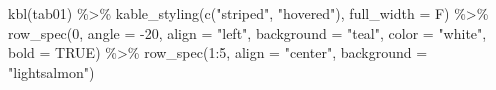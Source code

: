 \documentclass[
]{book}
\newenvironment{Shaded}{\begin{snugshade}}{\end{snugshade}}
\newcommand{\AttributeTok}[1]{\textcolor[rgb]{0.77,0.63,0.00}{#1}}
\newcommand{\ConstantTok}[1]{\textcolor[rgb]{0.00,0.00,0.00}{#1}}
\newcommand{\DecValTok}[1]{\textcolor[rgb]{0.00,0.00,0.81}{#1}}
\newcommand{\FunctionTok}[1]{\textcolor[rgb]{0.00,0.00,0.00}{#1}}
\newcommand{\NormalTok}[1]{#1}
\newcommand{\SpecialCharTok}[1]{\textcolor[rgb]{0.00,0.00,0.00}{#1}}
\newcommand{\StringTok}[1]{\textcolor[rgb]{0.31,0.60,0.02}{#1}}
\begin{document}
\begin{Shaded}
\begin{Highlighting}[]
\FunctionTok{kbl}\NormalTok{(tab01) }\SpecialCharTok{\%\textgreater{}\%} \FunctionTok{kable\_styling}\NormalTok{(}\FunctionTok{c}\NormalTok{(}\StringTok{"striped"}\NormalTok{, }\StringTok{"hovered"}\NormalTok{), }\AttributeTok{full\_width =}\NormalTok{ F) }\SpecialCharTok{\%\textgreater{}\%} 
  \FunctionTok{row\_spec}\NormalTok{(}\DecValTok{0}\NormalTok{, }\AttributeTok{angle =} \SpecialCharTok{{-}}\DecValTok{20}\NormalTok{, }\AttributeTok{align =} \StringTok{"left"}\NormalTok{, }\AttributeTok{background =} \StringTok{"teal"}\NormalTok{, }
    \AttributeTok{color =} \StringTok{"white"}\NormalTok{, }\AttributeTok{bold =} \ConstantTok{TRUE}\NormalTok{) }\SpecialCharTok{\%\textgreater{}\%} \FunctionTok{row\_spec}\NormalTok{(}\DecValTok{1}\SpecialCharTok{:}\DecValTok{5}\NormalTok{, }\AttributeTok{align =} \StringTok{"center"}\NormalTok{, }
  \AttributeTok{background =} \StringTok{"lightsalmon"}\NormalTok{)}
\end{Highlighting}
\end{Shaded}
\end{document}
